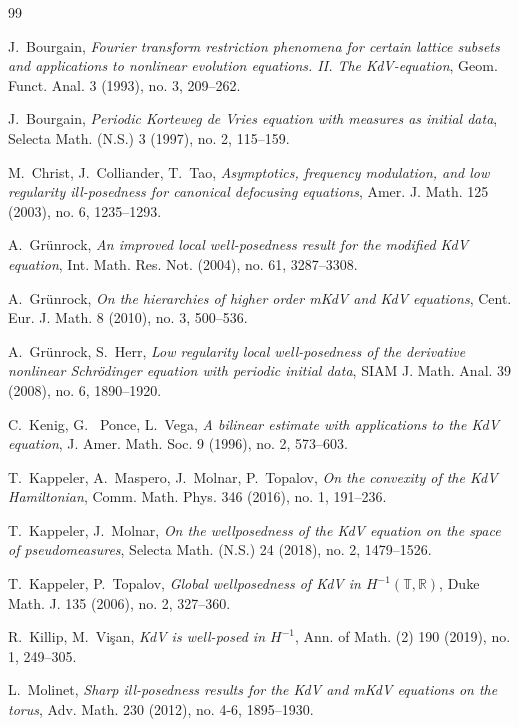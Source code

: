\documentclass[a4paper, 11pt]{amsart}
\newcommand{\T}{\mathbb{T}}
\newcommand{\R}{\mathbb{R}}
\theoremstyle{plain}
\theoremstyle{definition}
\theoremstyle{remark}
\newcommand{\5}{\text{V}}
\numberwithin{equation}{section}
\theoremstyle{mytheoremstyle} \newtheorem{nota}[thm]{Remark}
\theoremstyle{mytheoremstyle} \newtheorem{exemplo}[thm]{Example}
\begin{document}
\begin{thebibliography}{99}

J.~Bourgain,
\textit{Fourier transform restriction phenomena for certain lattice subsets and applications to nonlinear evolution equations. II. The KdV-equation},
Geom. Funct. Anal. 3 (1993), no. 3, 209--262.

J.~Bourgain,
\textit{Periodic Korteweg de Vries equation with measures as initial data}, Selecta Math. (N.S.) 3 (1997), no. 2, 115--159.

M.~Christ, J.~Colliander, T.~Tao,
\textit{Asymptotics, frequency modulation, and low regularity ill-posedness for canonical defocusing equations},
Amer. J. Math. 125 (2003), no. 6, 1235--1293.


A.~Gr\"unrock,
\textit{An improved local well-posedness result for the modified KdV equation}, Int. Math. Res. Not. (2004), no. 61, 3287--3308.

A.~Gr\"unrock,
\textit{On the hierarchies of higher order mKdV and KdV equations},
Cent. Eur. J. Math. 8 (2010), no. 3, 500--536.

A.~Gr\"unrock,  S.~Herr,
\textit{Low regularity local well-posedness of the derivative nonlinear Schr\"odinger equation with periodic initial data},
SIAM J. Math. Anal. 39 (2008), no. 6, 1890--1920.

C.~Kenig, G.~ Ponce, L.~Vega,
\textit{A bilinear estimate with applications to the KdV equation}, J. Amer. Math. Soc. 9 (1996), no. 2, 573--603.

T.~Kappeler, A.~Maspero, J.~Molnar, P.~Topalov,
\textit{On the convexity of the KdV Hamiltonian},
Comm. Math. Phys. 346 (2016), no. 1, 191--236.

T.~Kappeler, J.~Molnar,
\textit{On the wellposedness of the KdV equation on the space of pseudomeasures}, Selecta Math. (N.S.) 24 (2018), no. 2, 1479--1526.


T.~Kappeler, P.~Topalov,
\textit{Global wellposedness of KdV in $H^{-1}(\T,\R)$}, Duke Math. J. 135 (2006), no. 2, 327--360.

R.~Killip, M.~Vi\c{s}an,
\textit{KdV is well-posed in $H^{-1}$}, Ann. of Math. (2) 190 (2019), no. 1, 249--305.


L.~Molinet,
\textit{Sharp ill-posedness results for the KdV and mKdV equations on the torus},
Adv. Math. 230 (2012), no. 4-6, 1895--1930.


\end{thebibliography}
\end{document}
